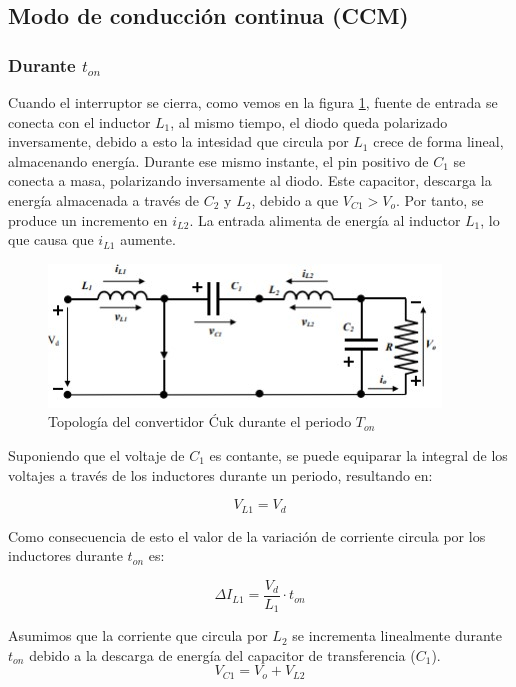 \documentclass[conference]{IEEEtran}
\begin{document}
\subsection{Modo de conducción continua (CCM)}
\subsubsection{Durante $t_{on}$}
Cuando el interruptor se cierra, como vemos en la figura \ref{fig: Ćuk ton}, fuente de entrada se conecta con el inductor $L_1$, al mismo tiempo, el diodo queda polarizado inversamente, debido a esto la intesidad que circula por $L_1$ crece de forma lineal, almacenando energía. Durante ese mismo instante, el pin positivo de $C_1$ se conecta a masa, polarizando inversamente al diodo. Este capacitor, descarga la energía almacenada a través de $C_2$ y $L_2$, debido a que $V_{C1}>V_o$. Por tanto, se produce un incremento en $i_{L2}$. La entrada alimenta de energía al inductor $L_1$, lo que causa que $i_{L1}$ aumente.

\begin{figure}[h]
    \centering
    \includegraphics[scale=0.8]{imagenes/cuk ton.jpg}
    \caption{Topología del convertidor Ćuk durante el periodo $T_{on}$}
    \label{fig: Ćuk ton}
\end{figure}

Suponiendo que el voltaje de $C_1$ es contante, se puede equiparar la integral de los voltajes a través de los inductores durante un periodo, resultando en:

\begin{equation}
    V_{L1}=V_d
\end{equation}

Como consecuencia de esto el valor de la variación de corriente circula por los inductores durante $t_{on}$ es:

\begin{equation}
    \Delta I_{L1}=\frac{V_d}{L_1}\cdot t_{on}
    \label{ecu: deltail1}
\end{equation}

Asumimos que la corriente que circula por $L_2$ se incrementa linealmente durante $t_{on}$ debido a la descarga de energía del capacitor de transferencia ($C_1$).
\begin{equation}
    V_{C1}=V_{o}+V_{L2}
\end{equation}
\end{document}
